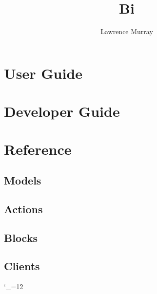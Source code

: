 \documentclass[a4paper,11pt,times]{report}
\title{\Huge{Bi}}
\author{Lawrence Murray}
\begin{document}
\maketitle

\tableofcontents

\chapter{User Guide\label{User_Guide}}



\chapter{Developer Guide\label{Developer_Guide}}



\chapter{Reference\label{Reference}}

\section{Models}


\section{Actions}


\section{Blocks}


\section{Clients}



\begingroup \catcode`_=12 %
\printindex
\endgroup
\end{document}
